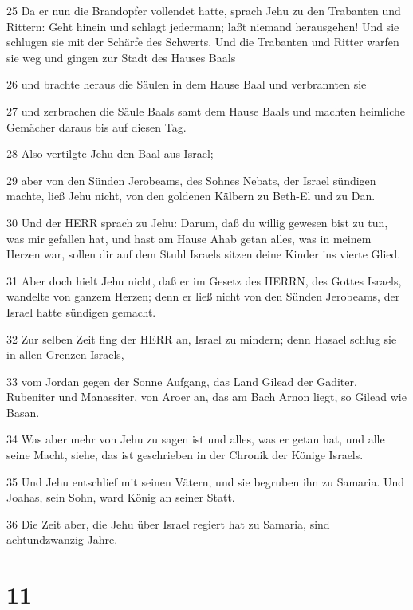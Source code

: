 \par 25 Da er nun die Brandopfer vollendet hatte, sprach Jehu zu den Trabanten und Rittern: Geht hinein und schlagt jedermann; laßt niemand herausgehen! Und sie schlugen sie mit der Schärfe des Schwerts. Und die Trabanten und Ritter warfen sie weg und gingen zur Stadt des Hauses Baals
\par 26 und brachte heraus die Säulen in dem Hause Baal und verbrannten sie
\par 27 und zerbrachen die Säule Baals samt dem Hause Baals und machten heimliche Gemächer daraus bis auf diesen Tag.
\par 28 Also vertilgte Jehu den Baal aus Israel;
\par 29 aber von den Sünden Jerobeams, des Sohnes Nebats, der Israel sündigen machte, ließ Jehu nicht, von den goldenen Kälbern zu Beth-El und zu Dan.
\par 30 Und der HERR sprach zu Jehu: Darum, daß du willig gewesen bist zu tun, was mir gefallen hat, und hast am Hause Ahab getan alles, was in meinem Herzen war, sollen dir auf dem Stuhl Israels sitzen deine Kinder ins vierte Glied.
\par 31 Aber doch hielt Jehu nicht, daß er im Gesetz des HERRN, des Gottes Israels, wandelte von ganzem Herzen; denn er ließ nicht von den Sünden Jerobeams, der Israel hatte sündigen gemacht.
\par 32 Zur selben Zeit fing der HERR an, Israel zu mindern; denn Hasael schlug sie in allen Grenzen Israels,
\par 33 vom Jordan gegen der Sonne Aufgang, das Land Gilead der Gaditer, Rubeniter und Manassiter, von Aroer an, das am Bach Arnon liegt, so Gilead wie Basan.
\par 34 Was aber mehr von Jehu zu sagen ist und alles, was er getan hat, und alle seine Macht, siehe, das ist geschrieben in der Chronik der Könige Israels.
\par 35 Und Jehu entschlief mit seinen Vätern, und sie begruben ihn zu Samaria. Und Joahas, sein Sohn, ward König an seiner Statt.
\par 36 Die Zeit aber, die Jehu über Israel regiert hat zu Samaria, sind achtundzwanzig Jahre.

\chapter{11}

